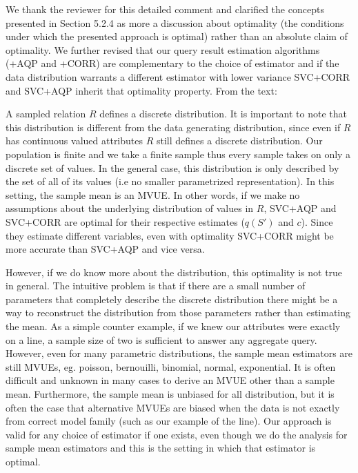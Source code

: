 We thank the reviewer for this detailed comment and clarified the concepts presented in Section 5.2.4 as more a discussion about optimality (the conditions under which the presented approach is optimal) rather than an absolute claim of optimality. We further revised that our query result estimation algorithms (\svcnospace+AQP and \svcnospace+CORR) are complementary to the choice of estimator and if the data distribution warrants a different estimator with lower variance SVC+CORR and SVC+AQP inherit that optimality property. From the text:  
\begin{displayquote}A sampled relation $R$ defines a discrete distribution. It is important to note that this distribution is different from the data generating distribution, since even if $R$ has continuous valued attributes $R$ still defines a discrete distribution. Our population is finite and we take a finite sample thus every sample takes on only a discrete set of values. In the general case, this distribution is only described by the set of all of its values (i.e no smaller parametrized representation). In this setting, the sample mean is an MVUE. In other words, if we make no assumptions about the underlying distribution of values in $R$, SVC+AQP and SVC+CORR are optimal for their respective estimates ($q(S')$ and $c$). Since they estimate different variables, even with optimality SVC+CORR might be more accurate than SVC+AQP and vice versa. 

However, if we do know more about the distribution, this optimality is not true in general. The intuitive problem is that if there are a small number of parameters that completely describe the discrete distribution there might be a way to reconstruct the distribution from those parameters rather than estimating the mean. As a simple counter example, if we knew our attributes were exactly on a line, a sample size of two is sufficient to answer any aggregate query. However, even for many parametric distributions, the sample mean estimators are still MVUEs, eg. poisson, bernouilli, binomial, normal, exponential. It is often difficult and unknown in many cases to derive an MVUE other than a sample mean. Furthermore, the sample mean is unbiased for all distribution, but it is often the case that alternative MVUEs are biased when the data is not exactly from correct model family (such as our example of the line). Our approach is valid for any choice of estimator if one exists, even though we do the analysis for sample mean estimators and this is the setting in which that estimator is optimal.\end{displayquote}

